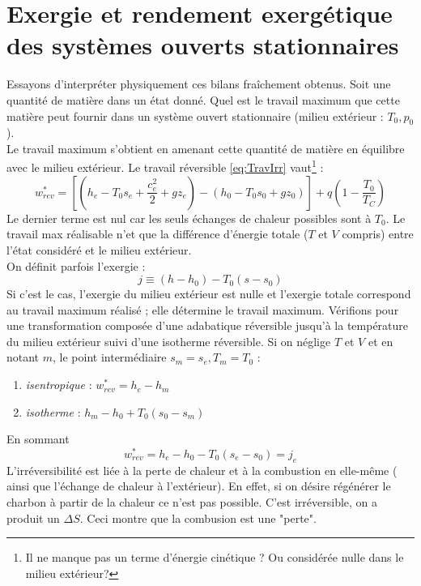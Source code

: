 		
	\newpage
	\section{Exergie et rendement exergétique des systèmes ouverts stationnaires}
	Essayons d’interpréter physiquement ces bilans fraîchement obtenus. Soit une 
	quantité de matière dans un état donné. Quel est le travail maximum que cette 
	matière peut fournir dans un système ouvert stationnaire (milieu extérieur : 
	$T_0,p_0$).\\
	Le travail maximum s'obtient en amenant cette quantité de matière en équilibre 
	avec le milieu extérieur. Le travail réversible \autoref{eq:TravIrr} vaut\footnote{
	Il ne manque pas un terme d'énergie cinétique ? Ou considérée nulle dans le milieu extérieur?} :
	\begin{equation}
	w_{rev}^* = \left[\left(h_e-T_0s_e+\dfrac{c_e^2}{2}+gz_e\right) - \left(h_0-T_0s_0
	+gz_0\right)\right] + q\left(1-\dfrac{T_0}{T_C}\right)
	\end{equation}
	Le dernier terme est nul car les seuls échanges de chaleur possibles sont à $T_0$. 
	Le travail max réalisable n'et que la différence d'énergie totale ($T$ et $V$ compris) 
	entre l'état considéré et le milieu extérieur.\\
	On définit parfois l'exergie :
	\begin{equation}
	j \equiv (h-h_0) - T_0(s-s_0)
	\end{equation}
	Si c'est le cas, l'exergie du milieu extérieur est nulle et l'exergie totale 
	correspond au travail maximum réalisé ; elle détermine le travail maximum. Vérifions 
	pour une transformation composée d'une adabatique réversible jusqu'à la température 
	du milieu extérieur suivi d'une isotherme réversible. Si on néglige $T$ et $V$ et 
	en notant $m$, le point intermédiaire $s_m=s_e, T_m=T_0$ :
	\begin{enumerate}
	\item \textit{isentropique} : $w_{rev}^* = h_e-h_m$
 	\item \textit{isotherme} : $h_m-h_0 + T_0(s_0-s_m)$
	\end{enumerate}
	En sommant
	\begin{equation}
	w_{rev}^* = h_e-h_0 - T_0(s_e-s_0) = j_e
	\end{equation}
	L'irréversibilité est liée à la perte de chaleur et à la combustion en elle-même (
	ainsi que l'échange de chaleur à l'extérieur). En effet, si on désire régénérer 
	le charbon à partir de la chaleur ce n'est pas possible. C'est irréversible, on a 
	produit un $\Delta S$. Ceci montre que la combusion est une "perte".\\
	
